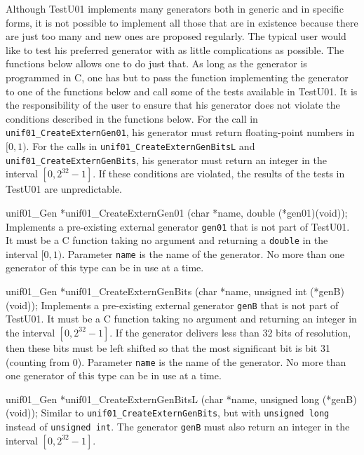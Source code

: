 
Although  TestU01 implements many generators both in generic and in
specific forms, it is not possible to implement all those that are in
existence because there are just too many and new ones are proposed
regularly. The typical user would like to test his preferred generator
with as little complications as possible. The functions below allows one
to do just that. As long as the generator is programmed in C,
one has but to pass  the function implementing the generator to one of the
functions below and call some of the tests available in TestU01.
It is the responsibility of the user to ensure that his generator does not
violate the conditions described in the functions below. For the
call in {\tt unif01\_CreateExternGen01}, his generator must return
floating-point numbers in $[0, 1)$. For the calls in
 {\tt unif01\_CreateExternGenBitsL} and  {\tt unif01\_CreateExternGenBits},
 his generator must return an integer in the interval $[0, 2^{32} - 1]$.
If these conditions are violated, the results of the tests in TestU01 are
unpredictable. %
\code


unif01_Gen *unif01_CreateExternGen01 (char *name, double (*gen01)(void));
\endcode
\tab Implements a pre-existing external generator {\tt gen01} that is
  not part of TestU01. \label{externgen}
 It must be a C function taking no argument and returning a {\tt double}
 in the interval $[0, 1)$. Parameter {\tt name} is the name of the generator.
 No more than one generator of this type can be in use at a  time.
\endtab
\code


unif01_Gen *unif01_CreateExternGenBits (char *name,
                                        unsigned int (*genB)(void));
\endcode
\tab Implements a pre-existing external generator {\tt genB} that is not part
 of TestU01. It must be a C function taking no argument and returning
 an integer in the interval $[0, 2^{32} - 1]$.
 If the generator delivers less than 32 bits of resolution, then these
 bits must be left shifted so that the most significant bit is bit 31
 (counting from 0). Parameter {\tt name} is the name of the generator.
 No more than one generator of this type can be in use at a  time.
 \endtab
\code


unif01_Gen *unif01_CreateExternGenBitsL (char *name,
                                         unsigned long (*genB)(void));
\endcode
\tab Similar to {\tt unif01\_CreateExternGenBits}, but with
{\tt unsigned long} instead of {\tt unsigned int}. The generator
{\tt genB} must also return  an integer in the interval $[0, 2^{32} - 1]$.
 \endtab
\code


